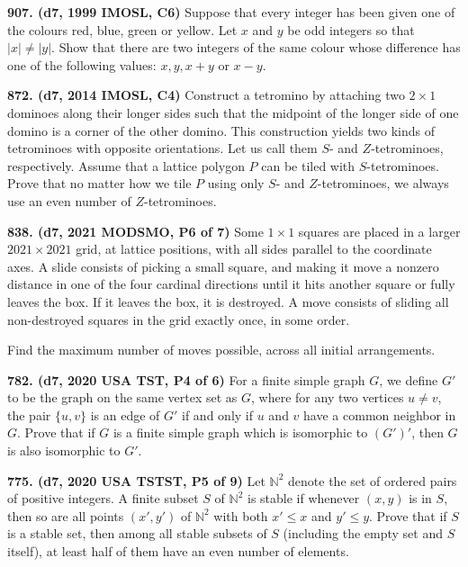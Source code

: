 \documentclass{article}
\begin{document}
\textbf{907. (\color{red}d7\color{black}, 1999 IMOSL, C6)} Suppose that every integer has been given one of the colours red, blue, green or yellow. Let $x$ and $y$ be odd integers so that $|x| \neq |y|$. Show that there are two integers of the same colour whose difference has one of the following values: $x,y,x+y$ or $x-y$.

\textbf{872. (\color{red}d7\color{black}, 2014 IMOSL, C4)} Construct a tetromino by attaching two $2 \times 1$ dominoes along their longer sides such that the midpoint of the longer side of one domino is a corner of the other domino. This construction yields two kinds of tetrominoes with opposite orientations. Let us call them $S$- and $Z$-tetrominoes, respectively.
Assume that a lattice polygon $P$ can be tiled with $S$-tetrominoes. Prove that no matter how we tile $P$ using only $S$- and $Z$-tetrominoes, we always use an even number of $Z$-tetrominoes.

\textbf{838. (\color{red}d7\color{black}, 2021 MODSMO, P6 of 7)} Some $1 \times 1$ squares are placed in a larger $2021 \times 2021$ grid, at lattice positions, with all sides parallel to the coordinate axes. A slide consists of picking a small square, and making it move a nonzero distance in one of the four cardinal directions until it hits another square or fully leaves the box. If it leaves the box, it is destroyed. A move consists of sliding all non-destroyed squares in the grid exactly once, in some order. \medskip

Find the maximum number of moves possible, across all initial arrangements.

\textbf{782. (\color{red}d7\color{black}, 2020 USA TST, P4 of 6)} For a finite simple graph $G$, we define $G'$ to be the graph on the same vertex set as $G$, where for any two vertices $u \neq v$, the pair $\{u,v\}$ is an edge of $G'$ if and only if $u$ and $v$ have a common neighbor in $G$.
\smallbreak
Prove that if $G$ is a finite simple graph which is isomorphic to $(G')'$, then $G$ is also isomorphic to $G'$.

\textbf{775. (\color{red}d7\color{black}, 2020 USA TSTST, P5 of 9)} Let $\mathbb{N}^2$ denote the set of ordered pairs of positive integers. A finite subset $S$ of $\mathbb{N}^2$ is stable if whenever $(x,y)$ is in $S$, then so are all points $(x',y')$ of $\mathbb{N}^2$ with both $x'\leq x$ and $y'\leq y$. Prove that if $S$ is a stable set, then among all stable subsets of $S$ (including the empty set and $S$ itself), at least half of them have an even number of elements.
\end{document}
